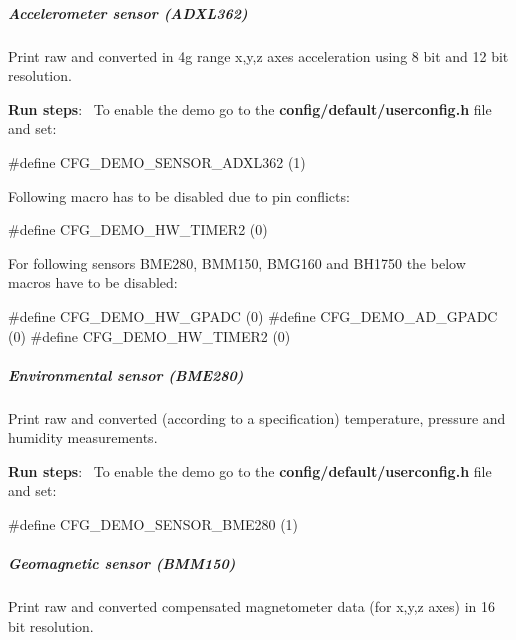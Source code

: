 \subparagraph*{Accelerometer sensor (A\+D\+X\+L362)}

Print raw and converted in 4g range x,y,z axes acceleration using 8 bit and 12 bit resolution.


\begin{DoxyItemize}
\item {\bfseries Run steps}\+:~\newline
 To enable the demo go to the {\bfseries {\ttfamily config/default/userconfig.\+h}} file and set\+: 
\begin{DoxyCode}
\textcolor{preprocessor}{#define CFG\_DEMO\_SENSOR\_ADXL362      (1)}
\end{DoxyCode}
 Following macro has to be disabled due to pin conflicts\+: 
\begin{DoxyCode}
\textcolor{preprocessor}{#define CFG\_DEMO\_HW\_TIMER2           (0)}
\end{DoxyCode}

\end{DoxyItemize}

For following sensors B\+M\+E280, B\+M\+M150, B\+M\+G160 and B\+H1750 the below macros have to be disabled\+: 
\begin{DoxyCode}
\textcolor{preprocessor}{#define CFG\_DEMO\_HW\_GPADC            (0)}
\textcolor{preprocessor}{#define CFG\_DEMO\_AD\_GPADC            (0)}
\textcolor{preprocessor}{#define CFG\_DEMO\_HW\_TIMER2           (0)}
\end{DoxyCode}


\subparagraph*{Environmental sensor (B\+M\+E280)}

Print raw and converted (according to a specification) temperature, pressure and humidity measurements.


\begin{DoxyItemize}
\item {\bfseries Run steps}\+:~\newline
 To enable the demo go to the {\bfseries {\ttfamily config/default/userconfig.\+h}} file and set\+: 
\begin{DoxyCode}
\textcolor{preprocessor}{#define CFG\_DEMO\_SENSOR\_BME280       (1)}
\end{DoxyCode}

\end{DoxyItemize}

\subparagraph*{Geomagnetic sensor (B\+M\+M150)}

Print raw and converted compensated magnetometer data (for x,y,z axes) in 16 bit resolution.


